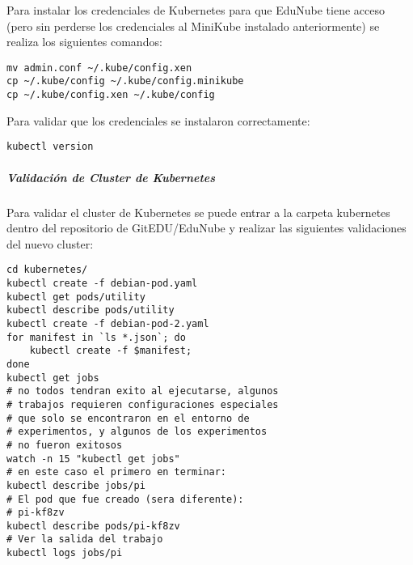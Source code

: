 Para instalar los credenciales de Kubernetes para que EduNube tiene acceso (pero sin perderse los credenciales al MiniKube instalado anteriormente) se realiza los siguientes comandos:
\begin{lstlisting}
mv admin.conf ~/.kube/config.xen
cp ~/.kube/config ~/.kube/config.minikube
cp ~/.kube/config.xen ~/.kube/config
\end{lstlisting}

Para validar que los credenciales se instalaron correctamente:
\begin{lstlisting}
kubectl version
\end{lstlisting}

\subparagraph{Validación de Cluster de Kubernetes}
Para validar el cluster de Kubernetes se puede entrar a la carpeta kubernetes dentro del repositorio de GitEDU/EduNube y realizar las siguientes validaciones del nuevo cluster:
\begin{lstlisting}
cd kubernetes/
kubectl create -f debian-pod.yaml
kubectl get pods/utility
kubectl describe pods/utility
kubectl create -f debian-pod-2.yaml
for manifest in `ls *.json`; do
    kubectl create -f $manifest;
done
kubectl get jobs
# no todos tendran exito al ejecutarse, algunos
# trabajos requieren configuraciones especiales
# que solo se encontraron en el entorno de
# experimentos, y algunos de los experimentos
# no fueron exitosos
watch -n 15 "kubectl get jobs"
# en este caso el primero en terminar:
kubectl describe jobs/pi
# El pod que fue creado (sera diferente):
# pi-kf8zv
kubectl describe pods/pi-kf8zv
# Ver la salida del trabajo
kubectl logs jobs/pi
\end{lstlisting}

